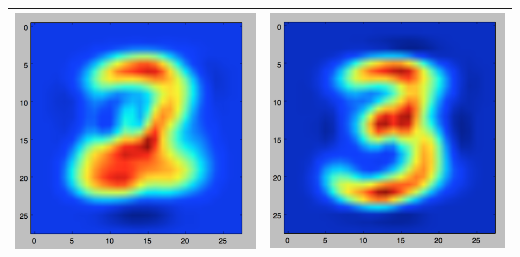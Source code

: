\documentclass[11pt]{article}
\begin{document}
\begin{table}[!th]
\begin{tabular}{|c|c|}
\hline
\includegraphics[scale=.15]{images/bayes2.png} & \includegraphics[scale=.15]{images/bayes3.png} \\
\hline

\end{tabular}
\end{table}
\end{document}
